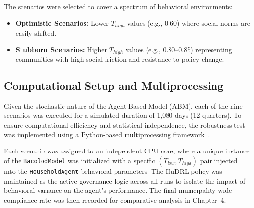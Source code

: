 The scenarios were selected to cover a spectrum of behavioral environments:
\begin{itemize}
    \item \textbf{Optimistic Scenarios:} Lower \(T_{high}\) values (e.g., 0.60) where social norms are easily shifted.
    \item \textbf{Stubborn Scenarios:} Higher \(T_{high}\) values (e.g., 0.80--0.85) representing communities with high social friction and resistance to policy change.
\end{itemize}

\subsection{Computational Setup and Multiprocessing}
Given the stochastic nature of the Agent-Based Model (ABM), each of the nine scenarios was executed for a simulated duration of 1,080 days (12 quarters). To ensure computational efficiency and statistical independence, the robustness test was implemented using a Python-based multiprocessing framework~\cite{mesa2023}. 

Each scenario was assigned to an independent CPU core, where a unique instance of the \texttt{BacolodModel} was initialized with a specific \((T_{low}, T_{high})\) pair injected into the \texttt{HouseholdAgent} behavioral parameters. The HuDRL policy was maintained as the active governance logic across all runs to isolate the impact of behavioral variance on the agent's performance. The final municipality-wide compliance rate was then recorded for comparative analysis in Chapter~4.